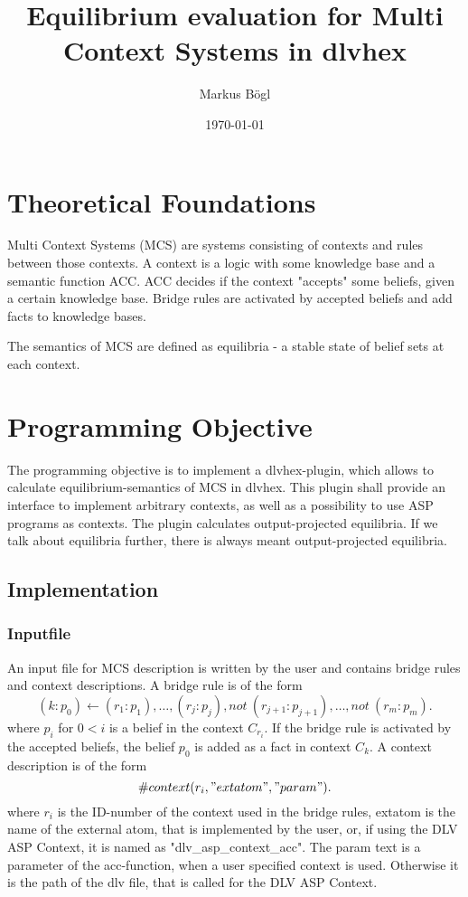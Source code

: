 \documentclass[11pt]{article}
\begin{document}
\title{Equilibrium evaluation for Multi Context Systems in dlvhex}
\author{Markus Bögl}
\date{\today}                                           %


\maketitle

\section{Theoretical Foundations}
Multi Context Systems (MCS) are systems consisting of contexts and rules between
those contexts. A context is a logic with some knowledge base and a semantic
function ACC. ACC decides if the context "accepts" some beliefs, given a certain
knowledge base. Bridge rules are activated by accepted beliefs and add facts to
knowledge bases.

The semantics of MCS are defined as equilibria - a stable state of belief sets
at each context.
\section{Programming Objective}
The programming objective is to implement a dlvhex-plugin, which allows to calculate equilibrium-semantics of
MCS in dlvhex. This plugin shall provide an interface to implement
arbitrary contexts, as well as a possibility to use ASP programs as contexts. The plugin calculates output-projected equilibria. If we talk about equilibria further, there is always meant output-projected equilibria.
\subsection{Implementation}

\subsubsection{Inputfile}
An input file for MCS description is written by the user and contains bridge rules and context descriptions. A bridge rule is of the form
\[ (k:p_{0}) \leftarrow (r_{1}:p_{1}), \ldots , (r_{j}:p_{j}), not\ (r_{j+1}:p_{j+1}), \ldots , not\ (r_{m}:p_{m}). \]
where \(p_{i}\) for \(0 < i\) is a belief in the context \(C_{r_{i}}\). If the bridge rule is activated by the accepted beliefs, the belief \(p_{0}\) is added as a fact in context \(C_{k}\).
A context description is of the form
\[ \#context(r_{i},"extatom","param"). \]
where \(r_{i}\) is the ID-number of the context used in the bridge rules, extatom is the name of the external atom, that is implemented by the user, or, if using the DLV ASP Context, it is named as "dlv\_asp\_context\_acc". The param text is a parameter of the acc-function, when a user specified context is used. Otherwise it is the path of the dlv file, that is called for the DLV ASP Context.
\end{document}
